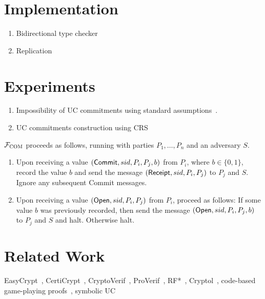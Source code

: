 \documentclass[acmsmall,review,anonymous]{acmart}\settopmatter{printfolios=true,printccs=false,printacmref=false}
\begin{document}
\section{Implementation}\label{sec:implementation}

\begin{enumerate}
\item Bidirectional type checker
\item Replication
\end{enumerate}

\section{Experiments}\label{sec:experiments}



\begin{enumerate}
\item Impossibility of UC commitments using standard
assumptions~\cite{canetti2001commitments}.
\item UC commitments construction using CRS
\end{enumerate}

\begin{func}[COM]
    $\mathcal{F}_{\textsc{COM}}$ proceeds as follows, running with parties $P_1, \ldots, P_n$ and an adversary $S$.
    \begin{enumerate}
        \item Upon receiving a value $({\sf Commit}, sid, P_i, P_j, b)$ from
          $P_i$, where $b \in \{ 0, 1 \}$, record the value $b$ and send the
          message $({\sf Receipt}, sid, P_i, P_j)$ to $P_j$ and $S$. Ignore any
          subsequent {\sf Commit} messages.

        \item Upon receiving a value $({\sf Open}, sid, P_i, P_j)$ from $P_i$,
          proceed as follows: If some value $b$ was previously recorded, then
          send the message $({\sf Open}, sid, P_i, P_j, b)$ to $P_j$ and $S$ and halt. Otherwise halt.
    \end{enumerate}
\end{func}



\section{Related Work}
EasyCrypt~\cite{barthe2011computer}, CertiCrypt~\cite{barthe2009formal},
CryptoVerif~\cite{blanchet2007cryptoverif},
ProVerif~\cite{blanchet2005proverif}, RF*~\cite{barthe2014probabilistic},
Cryptol~\cite{lewis2003cryptol}, code-based game-playing
proofs~\cite{bellare2006security}, symbolic UC~\cite{bohl2016symbolic}
\end{document}
